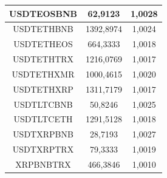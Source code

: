 \documentclass[thesis=B,czech]{FITthesis}[2019/03/21]
\begin{document}
\begin{table}
\begin{tabular}{|| c | c | c ||}
 \hline USDTEOSBNB & 62,9123 & 1,0028\\ 
 \hline USDTETHBNB & 1392,8974 & 1,0024\\ 
 \hline USDTETHEOS & 664,3333 & 1,0018\\ 
 \hline USDTETHTRX & 1216,0769 & 1,0017\\ 
 \hline USDTETHXMR & 1000,4615 & 1,0020\\ 
 \hline USDTETHXRP & 1311,7179 & 1,0017\\ 
 \hline USDTLTCBNB & 50,8246 & 1,0025\\ 
 \hline USDTLTCETH & 1291,5128 & 1,0018\\ 
 \hline USDTXRPBNB & 28,7193 & 1,0027\\ 
 \hline USDTXRPTRX & 79,3333 & 1,0019\\ 
 \hline XRPBNBTRX & 466,3846 & 1,0010\\ 
 \hline
\end{tabular}
\end{table}
\end{document}
